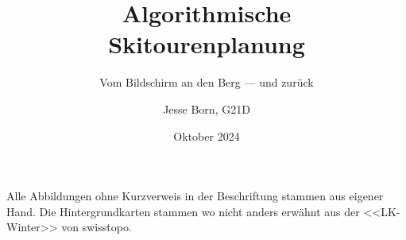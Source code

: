\documentclass[a4paper, listof=numbered]{scrarticle}
\title{\AKAfont\Huge\textcolor{AKSAcolor}{Algorithmische\\Skitourenplanung}}
\subtitle{Vom Bildschirm an den Berg --- und zurück}
\author{Jesse Born, G21D}
\date{Oktober 2024}
\begin{document}

\maketitle

\tableofcontents

% 






\clearpage


\printbibliography[heading=bibnumbered]
\clearpage

\appendix
\printglossary[type=\acronymtype, title={Abkürzungsverzeichnis}, nonumberlist]
\clearpage
\listoffigures
{}
Alle Abbildungen ohne Kurzverweis in der Beschriftung stammen aus eigener Hand. Die Hintergrundkarten stammen wo nicht anders erwähnt aus der <<LK-Winter>> von swisstopo.
\clearpage

\end{document}
